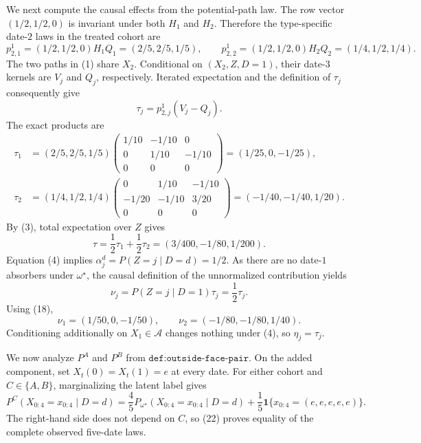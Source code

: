 We next compute the causal effects from the potential-path law.  The row vector \((1/2,1/2,0)\) is invariant under both \(H_1\) and \(H_2\).  Therefore the type-specific date-\(2\) laws in the treated cohort are
\[
p_{2,1}^1=(1/2,1/2,0)H_1Q_1=(2/5,2/5,1/5),
\qquad
p_{2,2}^1=(1/2,1/2,0)H_2Q_2=(1/4,1/2,1/4).                  \tag{16}
\]
The two paths in (1) share \(X_2\).  Conditional on \((X_2,Z,D=1)\), their date-\(3\) kernels are \(V_j\) and \(Q_j\), respectively.  Iterated expectation and the definition of \(\tau_j\) consequently give
\[
\tau_j=p_{2,j}^1(V_j-Q_j).                                  \tag{17}
\]
The exact products are
\[
\begin{aligned}
\tau_1
&=(2/5,2/5,1/5)
\begin{pmatrix}1/10&-1/10&0\\0&1/10&-1/10\\0&0&0\end{pmatrix}
=(1/25,0,-1/25),\\
\tau_2
&=(1/4,1/2,1/4)
\begin{pmatrix}0&1/10&-1/10\\-1/20&-1/10&3/20\\0&0&0\end{pmatrix}
=(-1/40,-1/40,1/20).
\end{aligned}                                                \tag{18}
\]
By (3), total expectation over \(Z\) gives
\[
\tau=\frac12\tau_1+\frac12\tau_2
=(3/400,-1/80,1/200).                                       \tag{19}
\]
Equation (4) implies \(\alpha_j^d=P(Z=j\mid D=d)=1/2\).  As there are no date-\(1\) absorbers under \(\omega^\star\), the causal definition of the unnormalized contribution yields
\[
\nu_j=P(Z=j\mid D=1)\tau_j=\frac12\tau_j.                 \tag{20}
\]
Using (18),
\[
\nu_1=(1/50,0,-1/50),
\qquad
\nu_2=(-1/80,-1/80,1/40).                                   \tag{21}
\]
Conditioning additionally on \(X_1\in\mathcal A\) changes nothing under (4), so \(\eta_j=\tau_j\).

We now analyze \(P^A\) and \(P^B\) from \(\texttt{def:outside-face-pair}\).  On the added component, set \(X_t(0)=X_t(1)=e\) at every date.  For either cohort and \(C\in\{A,B\}\), marginalizing the latent label gives
\[
P^C(X_{0:4}=x_{0:4}\mid D=d)
=\frac45P_{\omega^\star}(X_{0:4}=x_{0:4}\mid D=d)
+\frac15\mathbf 1\{x_{0:4}=(e,e,e,e,e)\}.                  \tag{22}
\]
The right-hand side does not depend on \(C\), so (22) proves equality of the complete observed five-date laws.

